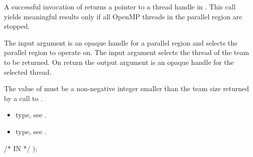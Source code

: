 \descr
A successful invocation of   returns a pointer to 
a thread handle in . 
This call yields meaningful results only if all OpenMP threads in the parallel 
region are stopped.

\argdesc
The input argument  is an opaque handle for a parallel region
 and selects the parallel region to operate on.
The input argument  selects the thread of the team to be returned. 
On return the output argument  is an opaque handle for the selected thread.

\restrictions
The value of  must be a non-negative integer smaller than the
team size returned by a call to .

\crossreferences
\begin{itemize}
	\item {} type, see .
	\item {} type, see .
\end{itemize}

%
%
\label{ompd:ompd_get_master_thread_in_parallel}
%
%
  /* IN */
);
%
%
%
%
%


